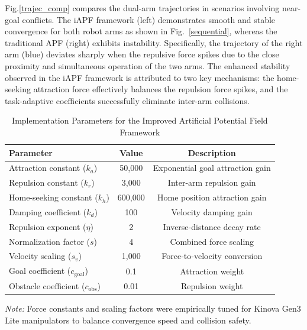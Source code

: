 \documentclass[pdflatex,sn-mathphys-num]{sn-jnl}%
\theoremstyle{thmstyleone}%
\theoremstyle{thmstylethree}%
\begin{document}
\noindent Fig.\ref{trajec_comp} compares the dual-arm trajectories in scenarios involving near-goal conflicts. The iAPF framework (left) demonstrates smooth and stable convergence for both robot arms as shown in Fig.~\ref{sequential}, whereas the traditional APF (right) exhibits instability. Specifically, the trajectory of the right arm (blue) deviates sharply when the repulsive force spikes due to the close proximity and simultaneous operation of the two arms. The enhanced stability observed in the iAPF framework is attributed to two key mechanisms: the home-seeking attraction force effectively balances the repulsion force spikes, and the task-adaptive coefficients successfully eliminate inter-arm collisions.
\begin{table}[t]
    \centering
    \caption{Implementation Parameters for the Improved Artificial Potential Field Framework}
    \label{tab:parameters}
    \scriptsize
    \begin{tabular}{lcc}
        \toprule
        \textbf{Parameter} & \textbf{Value} & \textbf{Description} \\
        \midrule\midrule
        Attraction constant ($k_{a}$)    & 50{,}000   & Exponential goal attraction gain \\
        Repulsion constant ($k_{r}$)     & 3{,}000    & Inter-arm repulsion gain \\
        Home-seeking constant ($k_{h}$)  & 600{,}000  & Home position attraction gain \\
        Damping coefficient ($k_{d}$)    & 100        & Velocity damping gain \\
        Repulsion exponent ($\eta$)      & 2      & Inverse-distance decay rate \\
        Normalization factor ($s$)       & 4          & Combined force scaling \\
        Velocity scaling ($s_{v}$)       & 1{,}000    & Force-to-velocity conversion \\
        Goal coefficient ($c_{\text{goal}}$) & 0.1     & Attraction weight \\
        Obstacle coefficient ($c_{\text{obs}}$) & 0.01 & Repulsion weight \\
        \midrule
    \end{tabular}
    \vspace{1mm}
    \begin{minipage}{0.98\columnwidth}
        \footnotesize \emph{Note:} Force constants and scaling factors were empirically tuned for Kinova Gen3 Lite manipulators to balance convergence speed and collision safety.
    \end{minipage}
\end{table}
\end{document}

